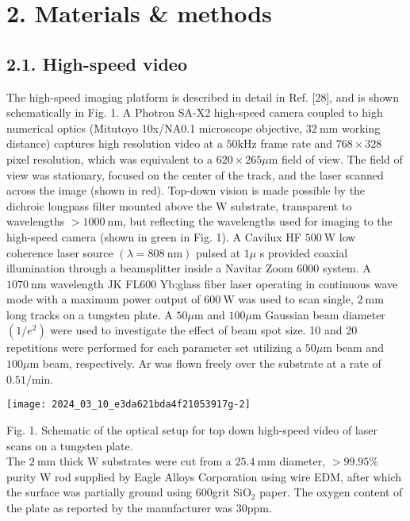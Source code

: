 \documentclass[10pt]{article}
\begin{document}
\section*{2. Materials \& methods}
\subsection*{2.1. High-speed video}
The high-speed imaging platform is described in detail in Ref. [28], and is shown schematically in Fig. 1. A Photron SA-X2 high-speed camera coupled to high numerical optics (Mitutoyo 10x/NA0.1 microscope objective, $32 \mathrm{~mm}$ working distance) captures high resolution video at a $50 \mathrm{kHz}$ frame rate and $768 \times 328$ pixel resolution, which was equivalent to a $620 \times 265 \mu \mathrm{m}$ field of view. The field of view was stationary, focused on the center of the track, and the laser scanned across the image (shown in red). Top-down vision is made possible by the dichroic longpass filter mounted above the $\mathrm{W}$ substrate, transparent to wavelengths $>1000 \mathrm{~nm}$, but reflecting the wavelengths used for imaging to the high-speed camera (shown in green in Fig. 1). A Cavilux HF $500 \mathrm{~W}$ low coherence laser source $(\lambda=808 \mathrm{~nm})$ pulsed at $1 \mu$ s provided coaxial illumination through a beamsplitter inside a Navitar Zoom 6000 system. A $1070 \mathrm{~nm}$ wavelength JK FL600 Yb:glass fiber laser operating in continuous wave mode with a maximum power output of $600 \mathrm{~W}$ was used to scan single, $2 \mathrm{~mm}$ long tracks on a tungsten plate. A $50 \mu \mathrm{m}$ and $100 \mu \mathrm{m}$ Gaussian beam diameter $\left(1 / e^{2}\right)$ were used to investigate the effect of beam spot size. 10 and 20 repetitions were performed for each parameter set utilizing a $50 \mu \mathrm{m}$ beam and $100 \mu \mathrm{m}$ beam, respectively. Ar was flown freely over the substrate at a rate of $0.51 / \mathrm{min}$.

\begin{center}
\texttt{[image: 2024\_03\_10\_e3da621bda4f21053917g-2]}
\end{center}

Fig. 1. Schematic of the optical setup for top down high-speed video of laser scans on a tungsten plate.\\
The $2 \mathrm{~mm}$ thick $\mathrm{W}$ substrates were cut from a $25.4 \mathrm{~mm}$ diameter, $>99.95 \%$ purity W rod supplied by Eagle Alloys Corporation using wire EDM, after which the surface was partially ground using 600grit $\mathrm{SiO}_{2}$ paper. The oxygen content of the plate as reported by the manufacturer was $30 \mathrm{ppm}$.
\end{document}

